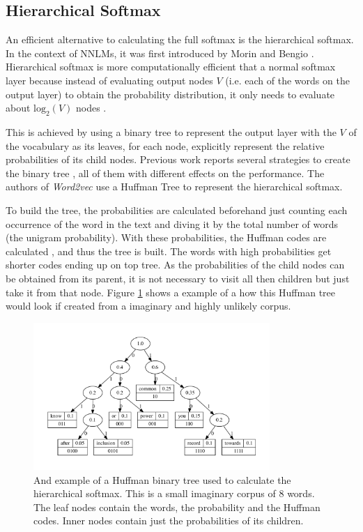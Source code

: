\subsection{Hierarchical Softmax}
\label{sec:sub-hs}


An efficient alternative to calculating the full softmax is the hierarchical
softmax. In the context of \ac{NNLM}s, it was first introduced by Morin and
Bengio \cite{Morin05hierarchicalprobabilistic}. Hierarchical softmax is more
computationally efficient that a normal softmax layer because instead of
evaluating output nodes $V$ (i.e. each of the words on the output layer) to
obtain the probability distribution, it only needs to evaluate about
$\text{log}_2 \left( V \right)$ nodes \cite{MikolovSCCD13}.

This is achieved by  using a binary tree to represent the output layer with
the $V$ of the vocabulary as its leaves, for each node, explicitly represent
the relative probabilities of its child nodes. Previous work reports several
strategies to create the binary tree \cite{Mnih08ascalable}, all of them with
different effects on the performance. The authors of \textit{Word2vec} use a
Huffman Tree  to represent the hierarchical softmax.

To build the tree, the probabilities are calculated beforehand just counting
each occurrence of  the word in the text 
and diving it by the total number of words (the unigram probability).  With these probabilities, the
Huffman codes are calculated \cite{huf52}, and thus the tree is built. The
words with high probabilities get shorter codes ending up on top tree. As the
probabilities of the child nodes can be obtained from its parent,  it is not
necessary to visit all then children but just take it from that node. Figure
\ref{fig:huffam-tree-w2v-example} shows a example of a how this Huffman tree
would look if created from a imaginary and  highly unlikely corpus. 




\begin{figure}[h]
    \centering
    \includegraphics[width=0.8\textwidth]{images/htree.pdf} 
    \caption{And example of a Huffman binary tree used to calculate the
      hierarchical softmax. This is a small imaginary corpus of 8 words. The
      leaf nodes contain the words, the probability and the Huffman codes.
      Inner nodes contain just the probabilities of its children. }
    \label{fig:huffam-tree-w2v-example}
\end{figure}

